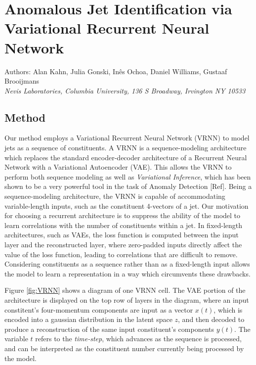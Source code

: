 \documentclass[letterpaper,11pt]{article}
\begin{document}
\section*{Anomalous Jet Identification via Variational Recurrent Neural Network}
Authors: Alan Kahn, Julia Gonski, In\^{e}s Ochoa, Daniel Williams, Gustaaf Brooijmans \\ \textit{Nevis Laboratories, Columbia University, 136 S Broadway, Irvington NY 10533}\\


\subsection{Method}
\label{sec:method}

Our method employs a Variational Recurrent Neural Network (VRNN) to model jets as a sequence of constituents. A VRNN is a sequence-modeling architecture which replaces the standard encoder-decoder architecture of a Recurrent Neural Network with a Variational Autoencoder (VAE). This allows the VRNN to perform both sequence modeling as well as \textit{Variational Inference}, which has been shown to be a very powerful tool in the task of Anomaly Detection [Ref]. Being a sequence-modeling architecture, the VRNN is capable of accommodating variable-length inputs, such as the constituent 4-vectors of a jet. Our motivation for choosing a recurrent architecture is to suppress the ability of the model to learn correlations with the number of constituents within a jet. In fixed-length architectures, such as VAEs, the loss function is computed between the input layer and the reconstructed layer, where zero-padded inputs directly affect the value of the loss function, leading to correlations that are difficult to remove. Considering constituents as a sequence rather than as a fixed-length input allows the model to learn a representation in a way which circumvents these drawbacks.


Figure \ref{fig:VRNN} shows a diagram of one VRNN cell. The VAE portion of the architecture is displayed on the top row of layers in the diagram, where an input constitent's four-momentum components are input as a vector $x(t)$, which is encoded into a gaussian distribution in the latent space $z$, and then decoded to produce a reconstruction of the same input constituent's components $y(t)$. The variable $t$ refers to the \textit{time-step}, which advances as the sequence is processed, and can be interpreted as the constituent number currently being processed by the model. 
\end{document}
